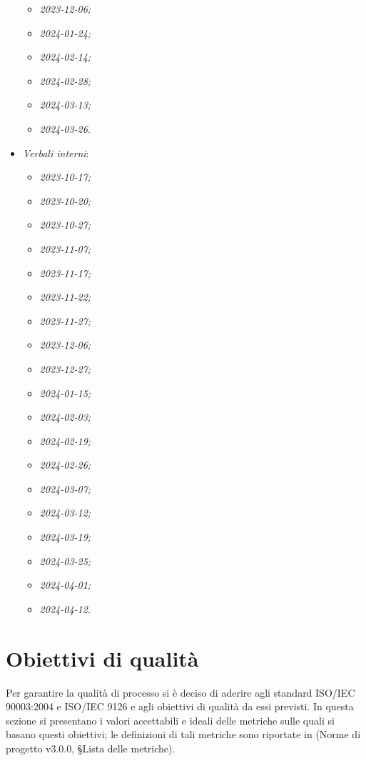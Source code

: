\documentclass[10pt, a4paper]{article}
\begin{document}
\begin{itemize}
\begin{itemize}
                \item \textit{2023-12-06;}
                \item \textit{2024-01-24;}
                \item \textit{2024-02-14;}
                \item \textit{2024-02-28;}
                \item \textit{2024-03-13;}
                \item \textit{2024-03-26.}
            \end{itemize}
        \item \textit{Verbali interni}:
            \begin{itemize}
                \item \textit{2023-10-17;}
                \item \textit{2023-10-20;}
                \item \textit{2023-10-27;}
                \item \textit{2023-11-07;}
                \item \textit{2023-11-17;}
                \item \textit{2023-11-22;}
                \item \textit{2023-11-27;}
                \item \textit{2023-12-06;}
                \item \textit{2023-12-27;}
                \item \textit{2024-01-15;}
                \item \textit{2024-02-03;}
                \item \textit{2024-02-19;}
                \item \textit{2024-02-26;}
                \item \textit{2024-03-07;}
                \item \textit{2024-03-12;}
                \item \textit{2024-03-19;}
                \item \textit{2024-03-25;}
                \item \textit{2024-04-01;}
                \item \textit{2024-04-12.}
            \end{itemize}
    \end{itemize}

    
\newpage
\section{Obiettivi di qualità}
\label{ObiettiviQualità}
Per garantire la qualità di processo si è deciso di aderire agli standard ISO/IEC 90003:2004 e ISO/IEC 9126 e agli obiettivi di qualità da essi previsti. In questa sezione si presentano i valori accettabili e ideali delle metriche sulle quali si basano questi obiettivi; le definizioni di tali metriche sono riportate in (Norme di progetto v3.0.0, \S Lista delle metriche).
\end{document}
